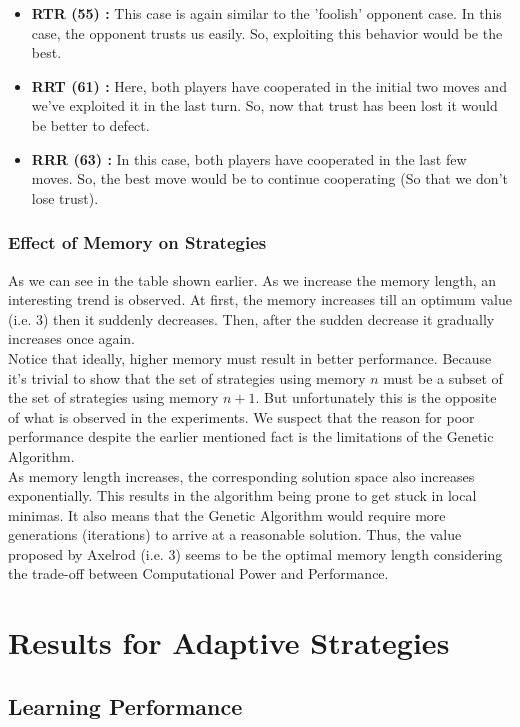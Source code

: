 \documentclass[a4paper]{article}
\begin{document}
\begin{itemize}
	\item \textbf{RTR (55) :} This case is again similar to the 'foolish' opponent case. In this case, the opponent trusts us easily. So, exploiting this behavior would be the best.
	\item \textbf{RRT (61) :} Here, both players have cooperated in the initial two moves and we've exploited it in the last turn. So, now that trust has been lost it would be better to defect.
	\item \textbf{RRR (63) :} In this case, both players have cooperated in the last few moves. So, the best move would be to continue cooperating (So that we don't lose trust).
	\end{itemize}
	
	\subsubsection{Effect of Memory on Strategies}	

	As we can see in the table shown earlier. As we increase the memory length, an interesting trend is observed. At first, the memory increases till an optimum value (i.e. 3) then it suddenly decreases. Then, after the sudden decrease it gradually increases once again.\\
	Notice that ideally, higher memory must result in better performance. Because it's trivial to show that the set of strategies using memory $n$ must be a subset of the set of strategies using memory $n+1$. But unfortunately this is the opposite of what is observed in the experiments. We suspect that the reason for poor performance despite the earlier mentioned fact is the limitations of the Genetic Algorithm.\\
	As memory length increases, the corresponding solution space also increases exponentially. This results in the algorithm being prone to get stuck in local minimas. It also means that the Genetic Algorithm would require more generations (iterations) to arrive at a reasonable solution. Thus, the value proposed by Axelrod (i.e. 3) seems to be the optimal memory length considering the trade-off between Computational Power and Performance.
	
	\section{Results for Adaptive Strategies}

	\subsection{Learning Performance}
		
\end{document}

